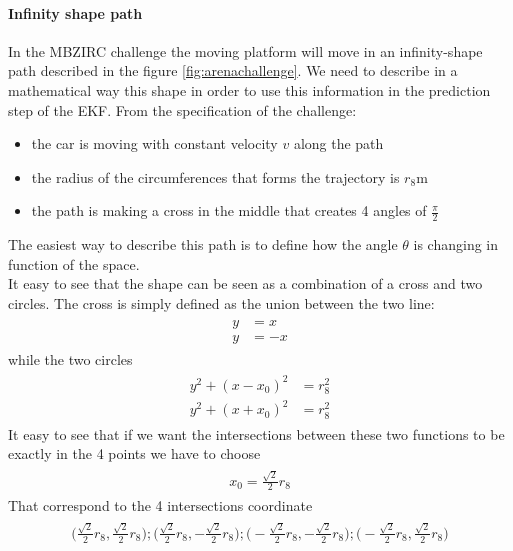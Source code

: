 \paragraph{Infinity shape path}
In the MBZIRC challenge the moving platform will move in an infinity-shape path described in the figure \ref{fig:arenachallenge}. 
We need to describe in a mathematical way this shape in order to use this information in the prediction step of the EKF.
From the specification of the challenge:
\begin{itemize}
\item the car is moving with constant velocity $v$ along the path
\item the radius of the circumferences that forms the trajectory is $r_{8}$m
\item the path is making a cross in the middle that creates 4 angles of $\frac{\pi}{2}$ 
\end{itemize}
The easiest way to describe this path is to define how the angle $\theta$ is changing in function of the space. \\
It easy to see that the shape can be seen as a combination of a cross and two circles.
The cross is simply defined as the union between the two line:
\begin{align}
\begin{split}
y &= x \\
y &= -x
\end{split}
\end{align}
while the two circles 
\begin{align}
\begin{split}
y^2 + (x - x_0)^2 &= r_{8}^2 \\
y^2 + (x + x_0)^2 &= r_{8}^2 
\end{split}
\end{align}
It easy to see that if we want the intersections between these two functions to be exactly in the 4 points we have to choose 
\begin{align}
\begin{split}
x_0 = \frac{\sqrt{2}}{2}r_{8}
\end{split}
\end{align}
That correspond to the 4 intersections coordinate
\begin{align}
\begin{split}
\Big(\frac{\sqrt{2}}{2}r_{8},\frac{\sqrt{2}}{2}r_{8}\Big);
\Big(\frac{\sqrt{2}}{2}r_{8},-\frac{\sqrt{2}}{2}r_{8}\Big);
\Big(-\frac{\sqrt{2}}{2}r_{8},-\frac{\sqrt{2}}{2}r_{8}\Big);
\Big(-\frac{\sqrt{2}}{2}r_{8},\frac{\sqrt{2}}{2}r_{8}\Big)
\end{split}
\end{align}

